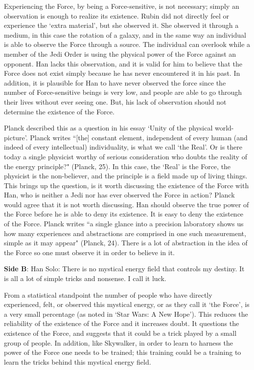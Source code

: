 \documentclass[11pt, oneside]{article}
\begin{document}
\par Experiencing the Force, by being a Force-sensitive, is not necessary; simply an observation is enough to realize its existence. Rubin did not directly feel or experience the `extra material', but she observed it. She observed it through a medium, in this case the rotation of a galaxy, and in the same way an individual is able to observe the Force through a source. The individual can overlook while a member of the Jedi Order is using the physical power of the Force against an opponent. Han lacks this observation, and it is valid for him to believe that the Force does not exist simply because he has never encountered it in his past. In addition, it is plausible for Han to have never observed the force since the number of Force-sensitive beings is very low, and people are able to go through their lives without ever seeing one. But, his lack of observation should not determine the existence of the Force.

\par Planck described this as a question in his essay `Unity of the physical world-picture'. Planck writes ``[the] constant element, independent of every human (and indeed of every intellectual) individuality, is what we call `the Real'. Or is there today a single physicist worthy of serious consideration who doubts the reality of the energy principle?" (Planck, 25). In this case, the `Real' is the Force, the physicist is the non-believer, and the principle is a field made up of living things. This brings up the question, is it worth discussing the existence of the Force with Han, who is neither a Jedi nor has ever observed the Force in action? Planck would agree that it is not worth discussing. Han should observe the true power of the Force before he is able to deny its existence. It is easy to deny the existence of the Force. Planck writes ``a single glance into a precision laboratory shows us how many experiences and abstractions are comprised in one such measurement, simple as it may appear" (Planck, 24). There is a lot of abstraction in the idea of the Force so one must observe it in order to believe in it.

\newpage 

\noindent \textbf{Side B}: Han Solo: There is no mystical energy field that controls my destiny. It is all a lot of simple tricks and nonsense. I call it luck. 

\par From a statistical standpoint the number of people who have directly experienced, felt, or observed this mystical energy, or as they call it `the Force', is a very small percentage (as noted in `Star Wars: A New Hope'). This reduces the reliability of the existence of the Force and it increases doubt. It questions the existence of the Force, and suggests that it could be a trick played by a small group of people. In addition, like Skywalker, in order to learn to harness the power of the Force one needs to be trained; this training could be a training to learn the tricks behind this mystical energy field.
\end{document}
